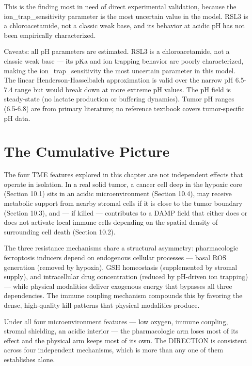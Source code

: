 \documentclass[11pt,twoside,openright]{report}
\begin{document}
This is the finding most in need of direct experimental validation, because the ion\_trap\_sensitivity parameter is the most uncertain value in the model. RSL3 is a chloroacetamide, not a classic weak base, and its behavior at acidic pH has not been empirically characterized.

Caveats: all pH parameters are estimated. RSL3 is a chloroacetamide, not a classic weak base --- its pKa and ion trapping behavior are poorly characterized, making the ion\_trap\_sensitivity the most uncertain parameter in this model. The linear Henderson-Hasselbalch approximation is valid over the narrow pH 6.5-7.4 range but would break down at more extreme pH values. The pH field is steady-state (no lactate production or buffering dynamics). Tumor pH ranges (6.5-6.8) are from primary literature; no reference textbook covers tumor-specific pH data.

\section{The Cumulative Picture}

The four TME features explored in this chapter are not independent effects that operate in isolation. In a real solid tumor, a cancer cell deep in the hypoxic core (Section 10.1) sits in an acidic microenvironment (Section 10.4), may receive metabolic support from nearby stromal cells if it is close to the tumor boundary (Section 10.3), and --- if killed --- contributes to a DAMP field that either does or does not activate local immune cells depending on the spatial density of surrounding cell death (Section 10.2).

The three resistance mechanisms share a structural asymmetry: pharmacologic ferroptosis inducers depend on endogenous cellular processes --- basal ROS generation (removed by hypoxia), GSH homeostasis (supplemented by stromal supply), and intracellular drug concentration (reduced by pH-driven ion trapping) --- while physical modalities deliver exogenous energy that bypasses all three dependencies. The immune coupling mechanism compounds this by favoring the dense, high-quality kill patterns that physical modalities produce.

\begin{finding}
Under all four microenvironment features --- low oxygen, immune coupling, stromal shielding, an acidic interior --- the pharmacologic arm loses most of its effect and the physical arm keeps most of its own. The DIRECTION is consistent across four independent mechanisms, which is more than any one of them establishes alone.
\end{finding}
\end{document}
